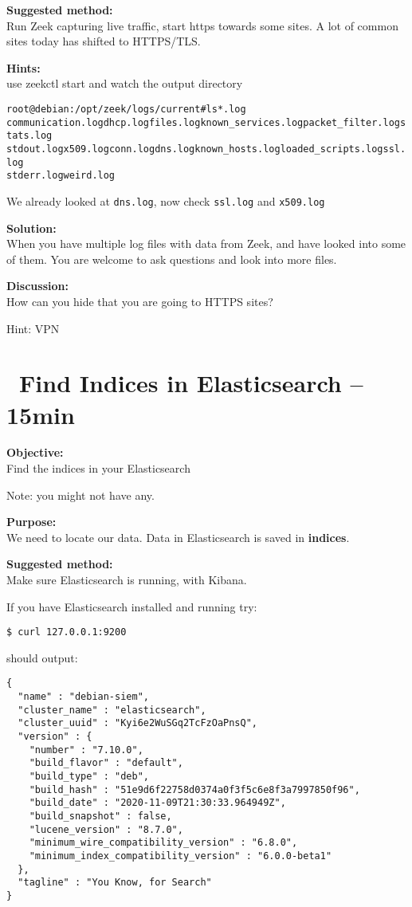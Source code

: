 \documentclass[a4paper,11pt,notitlepage]{report}
\begin{document}
{\bf Suggested method:}\\
Run Zeek capturing live traffic, start https towards some sites. A lot of common sites today has shifted to HTTPS/TLS.


{\bf Hints:}\\
use zeekctl start and watch the output directory

\begin{alltt}\small
root@debian:/opt/zeek/logs/current# ls *.log
communication.log  dhcp.log files.log known_services.log packet_filter.log  stats.log
stdout.log x509.log conn.log dns.log known_hosts.log loaded_scripts.log  ssl.log
stderr.log weird.log
\end{alltt}

We already looked at \verb+dns.log+, now check \verb+ssl.log+ and \verb+x509.log+

{\bf Solution:}\\
When you have multiple log files with data from Zeek, and have looked into some of them. You are welcome to ask questions and look into more files.


{\bf Discussion:}\\
How can you hide that you are going to HTTPS sites?

Hint: VPN




\chapter{\faExclamationTriangle\ Find Indices in Elasticsearch -- 15min}
\label{ex:es-find-indices}

{\bf Objective:}\\
Find the indices in your Elasticsearch

Note: you might not have any.

{\bf Purpose:}\\
We need to locate our data. Data in Elasticsearch is saved in {\bf indices}.


{\bf Suggested method:}\\
Make sure Elasticsearch is running, with Kibana.

If you have Elasticsearch installed and running try: 

\begin{verbatim}
$ curl 127.0.0.1:9200
\end{verbatim}
should output:
\begin{verbatim}
{
  "name" : "debian-siem",
  "cluster_name" : "elasticsearch",
  "cluster_uuid" : "Kyi6e2WuSGq2TcFzOaPnsQ",
  "version" : {
    "number" : "7.10.0",
    "build_flavor" : "default",
    "build_type" : "deb",
    "build_hash" : "51e9d6f22758d0374a0f3f5c6e8f3a7997850f96",
    "build_date" : "2020-11-09T21:30:33.964949Z",
    "build_snapshot" : false,
    "lucene_version" : "8.7.0",
    "minimum_wire_compatibility_version" : "6.8.0",
    "minimum_index_compatibility_version" : "6.0.0-beta1"
  },
  "tagline" : "You Know, for Search"
}
\end{verbatim}
\end{document}
